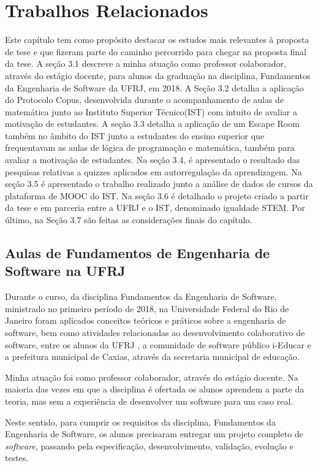 \chapter{Trabalhos Relacionados}

Este capítulo tem como propósito destacar os estudos mais relevantes à proposta de tese e que fizeram parte do caminho percorrido para chegar na proposta final da tese.  A seção 3.1 descreve a minha atuação como professor colaborador, através do estágio docente, para alunos da graduação na disciplina, Fundamentos da Engenharia de Software da UFRJ, em 2018.  A Seção 3.2 detalha a aplicação do Protocolo Copus, desenvolvida durante o acompanhamento de aulas de matemática junto ao Instituto Superior Técnico(IST) com intuito de avaliar a motivação de estudantes. A seção 3.3 detalha a aplicação de um Escape Room também no âmbito do IST junto a estudantes do ensino superior que frequentavam as aulas de lógica de programação e matemática, também para avaliar a motivação de estudantes. Na seção 3.4, é apresentado o resultado das pesquisas relativas a quizzes aplicados em autorregulação da aprendizagem. Na seção 3.5 é apresentado o trabalho realizado junto a análise de dados de cursos da plataforma de MOOC do IST. Na seção 3.6 é detalhado o projeto criado a partir da tese e em parceria entre a UFRJ e o IST, denominado igualdade STEM. Por último, na Seção 3.7 são feitas as considerações finais do capítulo.

\section{Aulas de Fundamentos de Engenharia de Software na UFRJ}

Durante o curso, da disciplina Fundamentos da Engenharia de Software, ministrado no primeiro período de 2018, na Universidade Federal do Rio de Janeiro foram aplicados conceitos teóricos e práticos sobre a engenharia de software, bem como atividades relacionadas ao desenvolvimento colaborativo de software, entre os alunos da UFRJ \citep{github_fes-ufrj_2018}, a comunidade de software público i-Educar \citep{portal_i-educar_2009} e a prefeitura municipal de Caxias, através da secretaria municipal de educação.

Minha atuação foi como professor colaborador, através do estágio docente. Na maioria das vezes em que a disciplina é ofertada os alunos aprendem a parte da teoria, mas sem a experiência de desenvolver um software para um caso real.

Neste sentido, para cumprir os requisitos da disciplina, Fundamentos da Engenharia de Software, os alunos precisaram entregar um projeto completo de \textit{software}, passando pela especificação, desenvolvimento, validação, evolução e testes.  

